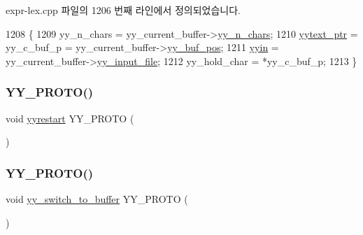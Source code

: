 expr-\/lex.\+cpp 파일의 1206 번째 라인에서 정의되었습니다.


\begin{DoxyCode}
1208         \{
1209         yy\_n\_chars = yy\_current\_buffer->\mbox{\hyperlink{structyy__buffer__state_a06406208824817acfec2183b79080945}{yy\_n\_chars}};
1210         \mbox{\hyperlink{expr-lex_8cpp_a790a191a93ef4d3b8c0bb43fd7480052}{yytext\_ptr}} = yy\_c\_buf\_p = yy\_current\_buffer->\mbox{\hyperlink{structyy__buffer__state_a58aa927f098b99d99e75da80f9b681ef}{yy\_buf\_pos}};
1211         \mbox{\hyperlink{expr-lex_8cpp_a87a127afa8f6c307fbfba10390675406}{yyin}} = yy\_current\_buffer->\mbox{\hyperlink{structyy__buffer__state_a4843d1422e3276b636d475a3095bd948}{yy\_input\_file}};
1212         yy\_hold\_char = *yy\_c\_buf\_p;
1213         \}
\end{DoxyCode}
\mbox{\label{expr-lex_8cpp_ad0030daf8055c0afc233a0c34bc12fd6}} 
\subsubsection{\texorpdfstring{Y\+Y\+\_\+\+P\+R\+O\+T\+O()}{YY\_PROTO()}\hspace{0.1cm}{\footnotesize\ttfamily [1/9]}}
{\footnotesize\ttfamily void \mbox{\hyperlink{expr-lex_8cpp_a3528c58cdd338886f23357f42e2061b8}{yyrestart}} Y\+Y\+\_\+\+P\+R\+O\+TO (\begin{DoxyParamCaption}\item[{(F\+I\+LE $\ast$input\+\_\+file)}]{ }\end{DoxyParamCaption})}

\mbox{\label{expr-lex_8cpp_aa4d8fcf388290ca0a2849fb6120b8bdb}} 
\subsubsection{\texorpdfstring{Y\+Y\+\_\+\+P\+R\+O\+T\+O()}{YY\_PROTO()}\hspace{0.1cm}{\footnotesize\ttfamily [2/9]}}
{\footnotesize\ttfamily void \mbox{\hyperlink{expr-lex_8cpp_a01ffaab94c1633ad975eb2e5d5ca360c}{yy\+\_\+switch\+\_\+to\+\_\+buffer}} Y\+Y\+\_\+\+P\+R\+O\+TO (\begin{DoxyParamCaption}\item[{(\mbox{\hyperlink{expr-lex_8cpp_a4e5bd2d129903df83f3d13effaf8f3e4}{Y\+Y\+\_\+\+B\+U\+F\+F\+E\+R\+\_\+\+S\+T\+A\+TE}} new\+\_\+buffer)}]{ }\end{DoxyParamCaption})}

